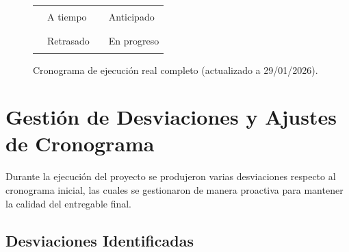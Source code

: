 \documentclass[12pt,a4paper]{article}
\begin{document}
\begin{figure}[H]
\begin{ganttchart}
\end{ganttchart}
\caption{Cronograma de ejecución real completo (actualizado a 29/01/2026).}

\vspace{0.5em}
\begin{center}
\begin{tabular}{llll}
\colorbox{ontime}{\rule{0.8cm}{0.35cm}} & A tiempo &
\colorbox{early}{\rule{0.8cm}{0.35cm}} & Anticipado \\[0.3em]
\colorbox{late}{\rule{0.8cm}{0.35cm}} & Retrasado &
\colorbox{inprogress}{\rule{0.8cm}{0.35cm}} & En progreso \\
\end{tabular}
\end{center}

\end{figure}

\bigskip

\section{Gestión de Desviaciones y Ajustes de Cronograma}

Durante la ejecución del proyecto se produjeron varias desviaciones respecto al cronograma inicial, las cuales se gestionaron de manera proactiva para mantener la calidad del entregable final.

\subsection{Desviaciones Identificadas}
\end{document}
